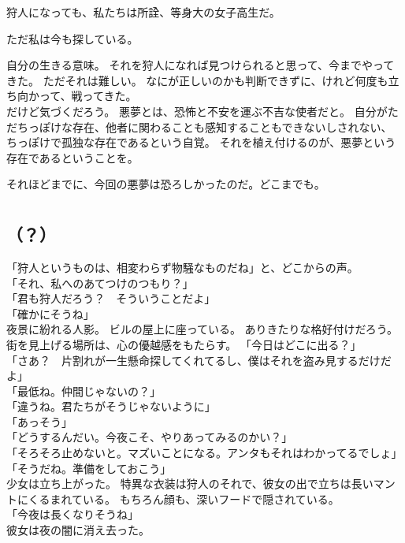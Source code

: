 \documentclass[../IHMain]{subfiles}
\begin{document}
狩人になっても、私たちは所詮、等身大の女子高生だ。

ただ私は今も探している。

自分の生きる意味。
それを狩人になれば見つけられると思って、今までやってきた。
ただそれは難しい。
なにが正しいのかも判断できずに、けれど何度も立ち向かって、戦ってきた。\\

だけど気づくだろう。
悪夢とは、恐怖と不安を運ぶ不吉な使者だと。
自分がただちっぽけな存在、他者に関わることも感知することもできないしされない、
ちっぽけで孤独な存在であるという自覚。
それを植え付けるのが、悪夢という存在であるということを。

それほどまでに、今回の悪夢は恐ろしかったのだ。どこまでも。

\section{}
\subsection*{（？）}
「狩人というものは、相変わらず物騒なものだね」と、どこからの声。\\
「それ、私へのあてつけのつもり？」\\
「君も狩人だろう？　そういうことだよ」\\
「確かにそうね」\\
夜景に紛れる人影。
ビルの屋上に座っている。
ありきたりな格好付けだろう。
街を見上げる場所は、心の優越感をもたらす。
「今日はどこに出る？」\\
「さあ？　片割れが一生懸命探してくれてるし、僕はそれを盗み見するだけだよ」\\
「最低ね。仲間じゃないの？」\\
「違うね。君たちがそうじゃないように」\\
「あっそう」\\
「どうするんだい。今夜こそ、やりあってみるのかい？」\\
「そろそろ止めないと。マズいことになる。アンタもそれはわかってるでしょ」\\
「そうだね。準備をしておこう」\\

少女は立ち上がった。
特異な衣装は狩人のそれで、彼女の出で立ちは長いマントにくるまれている。
もちろん顔も、深いフードで隠されている。\\
「今夜は長くなりそうね」\\
彼女は夜の闇に消え去った。
\end{document}

